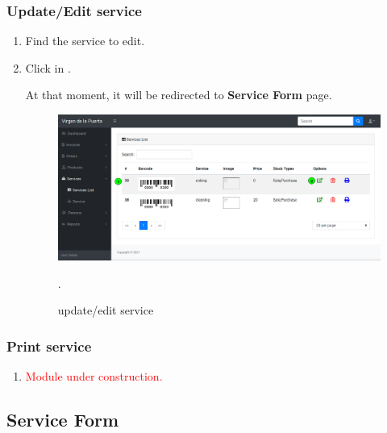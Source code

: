 \documentclass[a4paper,11pt]{refart}
\newcommand\InConstruction{\textcolor{red}{Module under construction.}}
\begin{document}
\subsubsection{Update/Edit service}
\begin{enumerate}
	\item Find the service to edit.
	\item Click in .
	\medskip
	\begin{leftbar}
		At that moment, it will be redirected to \textbf{Service Form} page.
	\end{leftbar}
	\begin{figure}[H]\centering
		\includegraphics[width=\textwidth]{images/service_list-update.png}
		\caption{update/edit service}
		\label{fig:service_list-update.png}.
	\end{figure}
\end{enumerate}

\subsubsection{Print service}
\begin{enumerate}
	\item \InConstruction{}
\end{enumerate}

\subsection{Service Form}\label{section:service_form}
\end{document}
